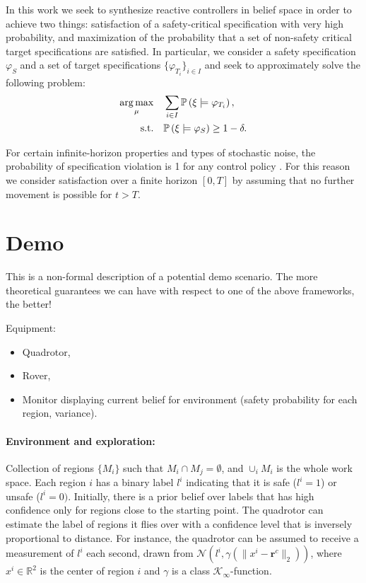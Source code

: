 \documentclass[conference]{IEEEtran}
\begin{document}
In this work we seek to synthesize reactive controllers in belief space in order to achieve two things: satisfaction of a safety-critical specification with very high probability, and maximization of the probability that a set of non-safety critical target specifications are satisfied. In particular, we consider a safety specification $\varphi_S$ and a set of target specifications $\{ \varphi_{T_i} \}_{i \in I}$ and seek to approximately solve the following problem:
\begin{equation}
\begin{aligned}
  \operatorname*{arg\,max}_{\mu} & \quad  \sum_{i \in I} \mathbb{P} \left( \xi \models \varphi_{T_i} \right), \\ 
  \text{s.t.} &\quad   \mathbb{P} \left( \xi \models \varphi_S \right) \geq 1 - \delta.
\end{aligned}
\end{equation}


For certain infinite-horizon properties and types of stochastic noise, the probability of specification violation is 1 for any control policy \cite{Ehlers2016}. For this reason we consider satisfaction over a finite horizon $[0, T]$ by assuming that no further movement is possible for $t > T$.


\section{Demo}


This is a non-formal description of a potential demo scenario. The more theoretical guarantees we can have with respect to one of the above frameworks, the better!

Equipment:
\begin{itemize}
  \item Quadrotor,
  \item Rover,
  \item Monitor displaying current belief for environment (safety probability for each region, variance).
\end{itemize}


\paragraph{Environment and exploration:} Collection of regions $\{ M_i \}$ such that $M_i \cap M_j = \emptyset$, and $\cup_i M_i$ is the whole work space. Each region $i$ has a binary label $l^i$ indicating that it is safe ($l^i = 1$) or unsafe ($l^i=0)$. Initially, there is a prior belief over labels that has high confidence only for regions close to the starting point. The quadrotor can estimate the label of regions it flies over with a confidence level that is inversely proportional to distance. For instance, the quadrotor can be assumed to receive a measurement of $l^i$ each second, drawn from $\mathcal N(l^i, \gamma(\| x^i - \mathbf{r}^c \|_2) )$, where $x^i \in \mathbb{R}^2$ is the center of region $i$ and $\gamma$ is a class $\mathcal K_\infty$-function.
\end{document}
